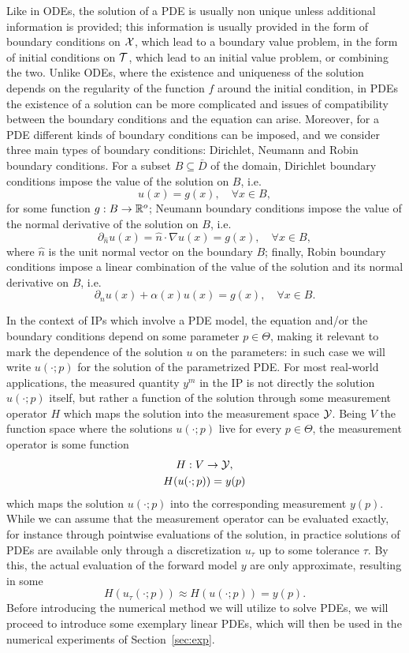 Like in ODEs, the solution of a PDE is usually non unique unless additional information is provided; this information is usually provided in the form of boundary conditions on $\mathcal X$, which lead to a boundary value problem, in the form of initial conditions on $\mathcal T$, which lead to an initial value problem, or combining the two.
Unlike ODEs, where the existence and uniqueness of the solution depends on the regularity of the function $f$ around the initial condition, in PDEs the existence of a solution can be more complicated and issues of compatibility between the boundary conditions and the equation can arise.
Moreover, for a PDE different kinds of boundary conditions can be imposed, and we consider three main types of boundary conditions: Dirichlet, Neumann and Robin boundary conditions.
For a subset $B \subseteq \bar D$ of the domain, Dirichlet boundary conditions impose the value of the solution on $B$, i.e.
\[
    u(x) = g(x), \quad \forall x \in B,
\]
for some function $g: B \rightarrow \mathbb{R}^o$;
Neumann boundary conditions impose the value of the normal derivative of the solution on $B$, i.e.
\[
    \partial_{\hat{n}} u(x)= \hat n \cdot \nabla u(x) = g(x), \quad \forall x \in B,
\]
where $\hat n$ is the unit normal vector on the boundary $B$; 
finally, Robin boundary conditions impose a linear combination of the value of the solution and its normal derivative on $B$, i.e.
\[
    \partial_{\hat{n}} u(x) + \alpha(x) u(x) = g(x), \quad \forall x \in B.
\]

In the context of IPs which involve a PDE model, the equation and/or the boundary conditions depend on some parameter $p \in \Theta$, making it relevant to mark the dependence of the solution $u$ on the parameters: in such case we will write $u(\cdot;p)$ for the solution of the parametrized PDE.
For most real-world applications, the measured quantity $y^m$ in the IP is not directly the solution $u(\cdot;p)$ itself, but rather a function of the solution through some measurement operator $H$ which maps the solution into the measurement space $\mathcal Y$.
Being $V$ the function space where the solutions $u(\cdot;p)$ live for every $p \in \Theta$, the measurement operator is some function 
\begin{equation} \label{eq:measurement-operator}
    \begin{gathered}
        H : V \rightarrow \mathcal Y, \\
        H(u(\cdot;p)) = y(p)
    \end{gathered}
\end{equation}
which maps the solution $u(\cdot;p)$ into the corresponding measurement $y(p)$.
While we can assume that the measurement operator can be evaluated exactly, for instance through pointwise evaluations of the solution, in practice solutions of PDEs are available only through a discretization $u_\tau$ up to some tolerance $\tau$.
By this, the actual evaluation of the forward model $y$ are only approximate, resulting in some
\[
    H(u_\tau(\cdot;p)) \approx H(u(\cdot;p)) = y(p) .
\]
Before introducing the numerical method we will utilize to solve PDEs, we will proceed to introduce some exemplary linear PDEs, which will then be used in the numerical experiments of Section~\ref{sec:exp}.\medskip

